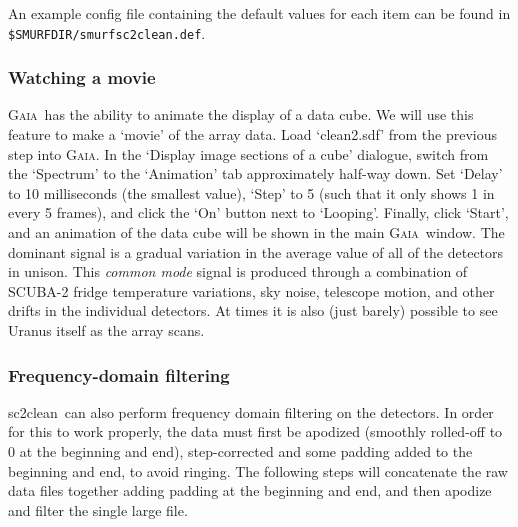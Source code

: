 \documentclass[twoside,11pt]{article}
\newcommand{\xref}[3]{#1}
\newcommand{\xlabel}[1]{}
\renewcommand{\_}{\texttt{\symbol{95}}}
\newcommand{\gaia}{\xref{\textsc{Gaia}}{sun214}{}}
\newcommand{\task}[1]{\textsf{#1}}
\newcommand{\clean}{\xref{\task{sc2clean}}{sun258}{SC2CLEAN}}
\begin{document}
An example config file containing the default values for each item
can be found in \texttt{\${SMURF\_DIR}/smurf\_sc2clean.def}.

\subsubsection{\xlabel{movie}Watching a movie}

\gaia\ has the ability to animate the display of a data cube. We will
use this feature to make a `movie' of the array data. Load
`clean2.sdf' from the previous step into \gaia. In the `Display image
sections of a cube' dialogue, switch from the `Spectrum' to the
`Animation' tab approximately half-way down.  Set `Delay' to 10
milliseconds (the smallest value), `Step' to 5 (such that it only
shows 1 in every 5 frames), and click the `On' button next to
`Looping'. Finally, click `Start', and an animation of the data cube
will be shown in the main \gaia\ window. The dominant signal is a
gradual variation in the average value of all of the detectors in
unison. This {\em common mode} signal is produced through a
combination of SCUBA-2 fridge temperature variations, sky noise,
telescope motion, and other drifts in the individual detectors. At
times it is also (just barely) possible to see Uranus itself as the
array scans.

\subsubsection{\xlabel{fftfilter}Frequency-domain filtering}

\clean\ can also perform frequency domain filtering on the
detectors. In order for this to work properly, the data must first be
apodized (smoothly rolled-off to 0 at the beginning and end),
step-corrected and some padding added to the beginning and end, to
avoid ringing. The following steps will concatenate the raw data files
together adding padding at the beginning and end, and then apodize and
filter the single large file.
\end{document}
